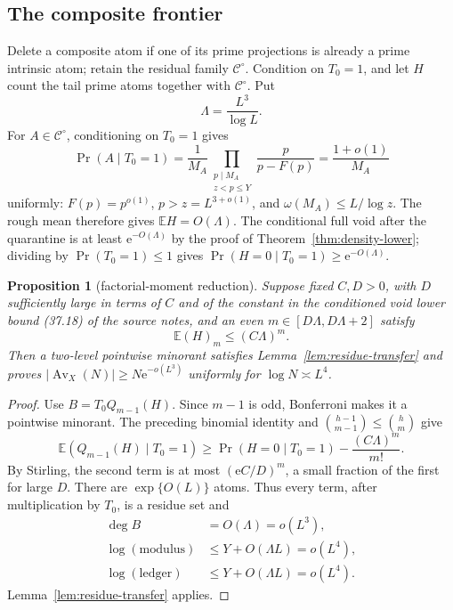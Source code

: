 \documentclass[10pt,reqno]{amsart}
\newtheorem{proposition}[theorem]{Proposition}
\theoremstyle{definition}
\newcommand{\Av}{\operatorname {Av}}
\newcommand{\e}{\mathrm e}
\newcommand{\1}{\mathbf 1}
\begin{document}
\subsection{The composite frontier}
Delete a composite atom if one of its prime projections is already a prime intrinsic atom; retain the residual family $\mathcal C^\circ$.  Condition on $T_0=1$, and let $H$ count the tail prime atoms together with $\mathcal C^\circ$.  Put
\[
 \Lambda=\frac{L^3}{\log L}.
\]
For $A\in\mathcal C^\circ$, conditioning on $T_0=1$ gives
\[
 \Pr(A\mid T_0=1)=\frac1{M_A}
 \prod_{\substack{p\mid M_A\\z<p\leq Y}}
 \frac{p}{p-F(p)}=\frac{1+o(1)}{M_A}
\]
uniformly: $F(p)=p^{o(1)}$, $p>z=L^{3+o(1)}$, and
$\omega(M_A)\leq L/\log z$.  The rough mean therefore gives
$\mathbb EH=O(\Lambda)$.  The conditional full void after the quarantine is at least $\e^{-O(\Lambda)}$ by the proof of Theorem~\ref{thm:density-lower}; dividing by $\Pr(T_0=1)\leq1$ gives
$\Pr(H=0\mid T_0=1)\geq\e^{-O(\Lambda)}$.

\begin{proposition}[factorial-moment reduction]\label{prop:factorial}
Suppose fixed $C,D>0$, with $D$ sufficiently large in terms of $C$ and of the constant in the conditioned void lower bound (37.18) of the source notes, and an even $m\in[D\Lambda,D\Lambda+2]$ satisfy
\begin{equation}\label{eq:factorial-target}
 \mathbb E(H)_m\leq(C\Lambda)^m.
\end{equation}
Then a two-level pointwise minorant satisfies Lemma~\ref{lem:residue-transfer} and proves
$|\Av_X(N)|\geq N\e^{-o(L^3)}$ uniformly for $\log N\asymp L^4$.
\end{proposition}
\begin{proof}
Use $B=T_0Q_{m-1}(H)$.  Since $m-1$ is odd, Bonferroni makes it a pointwise minorant.  The preceding binomial identity and
$\binom{h-1}{m-1}\leq\binom{h}{m}$ give
\[
 \mathbb E(Q_{m-1}(H)\mid T_0=1)
 \geq\Pr(H=0\mid T_0=1)-\frac{(C\Lambda)^m}{m!}.
\]
By Stirling, the second term is at most $(\e C/D)^m$, a small fraction of the first for large $D$.  There are $\exp\{O(L)\}$ atoms.  Thus every term, after multiplication by $T_0$, is a residue set and
\[
 \begin{aligned}
 \deg B&=O(\Lambda)=o(L^3),\\
 \log(\mathrm{modulus})&\leq Y+O(\Lambda L)=o(L^4),\\
 \log(\mathrm{ledger})&\leq Y+O(\Lambda L)=o(L^4).
 \end{aligned}
\]
Lemma~\ref{lem:residue-transfer} applies.
\end{proof}
\end{document}
